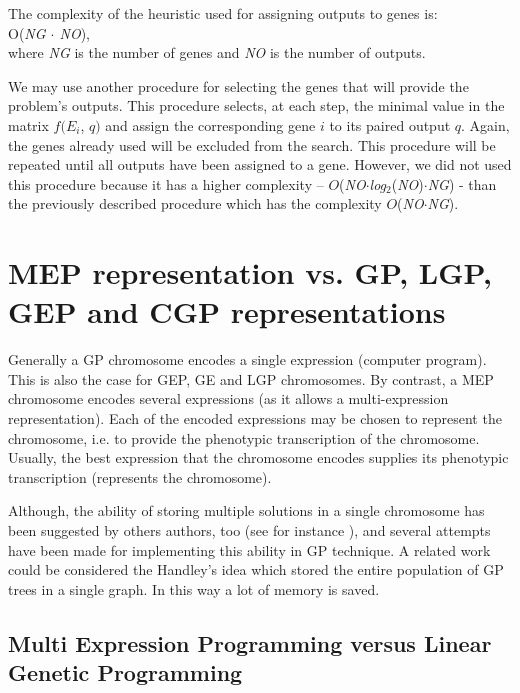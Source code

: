 \documentclass [11pt]{article}
\begin{document}
The complexity of the heuristic used for assigning outputs to genes is: \\

O(\textit{NG $ \cdot $ NO}), \\

\noindent
where \textit{NG} is the number of genes and \textit{NO} is the number of outputs.

We may use another procedure for selecting the genes that will provide the 
problem's outputs. This procedure selects, at each step, the minimal value 
in the matrix $f(E_{i}$, $q)$ and assign the corresponding gene $i$ to its paired 
output $q$. Again, the genes already used will be excluded from the search. 
This procedure will be repeated until all outputs have been assigned to a 
gene. However, we did not used this procedure because it has a higher 
complexity -- $O$(\textit{NO}$ \cdot $\textit{log}$_{2}$(\textit{NO})$ \cdot $\textit{NG}) - than the previously 
described procedure which has the complexity $O$(\textit{NO}$ \cdot $\textit{NG}). 

\section{MEP representation vs. GP, LGP, GEP and CGP representations}
\label{MEPvsOthers}

Generally a GP chromosome encodes a single expression (computer program). 
This is also the case for GEP, GE and LGP chromosomes. By contrast, a MEP 
chromosome encodes several expressions (as it allows a multi-expression 
representation). Each of the encoded expressions may be chosen to represent 
the chromosome, i.e. to provide the phenotypic transcription of the 
chromosome. Usually, the best expression that the chromosome encodes 
supplies its phenotypic transcription (represents the chromosome).

Although, the ability of storing multiple solutions in a single chromosome 
has been suggested by others authors, too (see for instance \cite{lones1}), and 
several attempts have been made for implementing this ability in GP 
technique. A related work could be considered the Handley's idea \cite{handley1} which stored the entire population of GP 
trees in a single graph. In this way a lot of memory is saved. 

\subsection{Multi Expression Programming versus Linear Genetic Programming}
\end{document}
